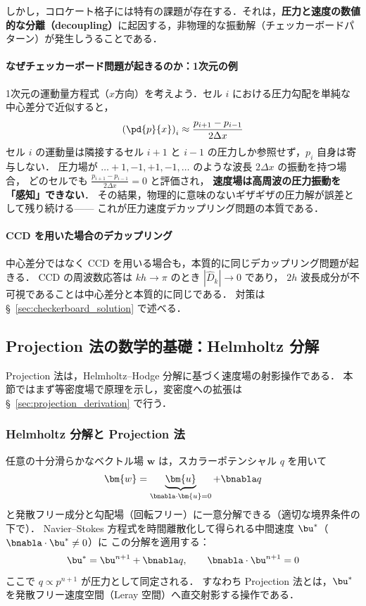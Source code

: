 しかし，コロケート格子には特有の課題が存在する．それは，\textbf{圧力と速度の数値的な分離（decoupling）}に起因する，非物理的な振動解（チェッカーボードパターン）が発生しうることである．

\paragraph{なぜチェッカーボード問題が起きるのか：1次元の例}

1次元の運動量方程式（$x$方向）を考えよう．セル $i$ における圧力勾配を単純な中心差分で近似すると，
\[ \left(\pd{p}{x}\right)_i \approx \frac{p_{i+1} - p_{i-1}}{2\Delta x} \]
セル $i$ の運動量は隣接するセル $i+1$ と $i-1$ の圧力しか参照せず，$p_i$ 自身は寄与しない．
圧力場が $\ldots +1, -1, +1, -1, \ldots$ のような波長 $2\Delta x$ の振動を持つ場合，
どのセルでも $\frac{p_{i+1}-p_{i-1}}{2\Delta x} = 0$ と評価され，
\textbf{速度場は高周波の圧力振動を「感知」できない}．
その結果，物理的に意味のないギザギザの圧力解が誤差として残り続ける——
これが圧力速度デカップリング問題の本質である．

\paragraph{CCD を用いた場合のデカップリング}
中心差分ではなく CCD を用いる場合も，本質的に同じデカップリング問題が起きる．
CCD の周波数応答は $kh \to \pi$ のとき $|\hat{D}_k| \to 0$ であり，
$2h$ 波長成分が不可視であることは中心差分と本質的に同じである．
対策は §~\ref{sec:checkerboard_solution} で述べる．

\subsection{Projection 法の数学的基礎：Helmholtz 分解}
\label{sec:helmholtz}

Projection 法は，Helmholtz--Hodge 分解に基づく速度場の射影操作である．
本節ではまず等密度場で原理を示し，変密度への拡張は §~\ref{sec:projection_derivation} で行う．

\subsubsection{Helmholtz 分解と Projection 法}

任意の十分滑らかなベクトル場 $\bm{w}$ は，スカラーポテンシャル $q$ を用いて
\begin{equation}
  \bm{w} = \underbrace{\bm{u}}_{\bnabla\cdot\bm{u}=0}
           + \bnabla q
  \label{eq:helmholtz}
\end{equation}
と発散フリー成分と勾配場（回転フリー）に一意分解できる（適切な境界条件の下で）．
Navier--Stokes 方程式を時間離散化して得られる中間速度 $\bu^*$（$\bnabla\cdot\bu^* \neq 0$）に
この分解を適用する：
\begin{equation}
  \bu^* = \bu^{n+1} + \bnabla q,
  \qquad \bnabla\cdot\bu^{n+1}=0
  \label{eq:projection_decomp}
\end{equation}
ここで $q \propto p^{n+1}$ が圧力として同定される．
すなわち Projection 法とは，$\bu^*$ を発散フリー速度空間（Leray 空間）へ直交射影する操作である．

